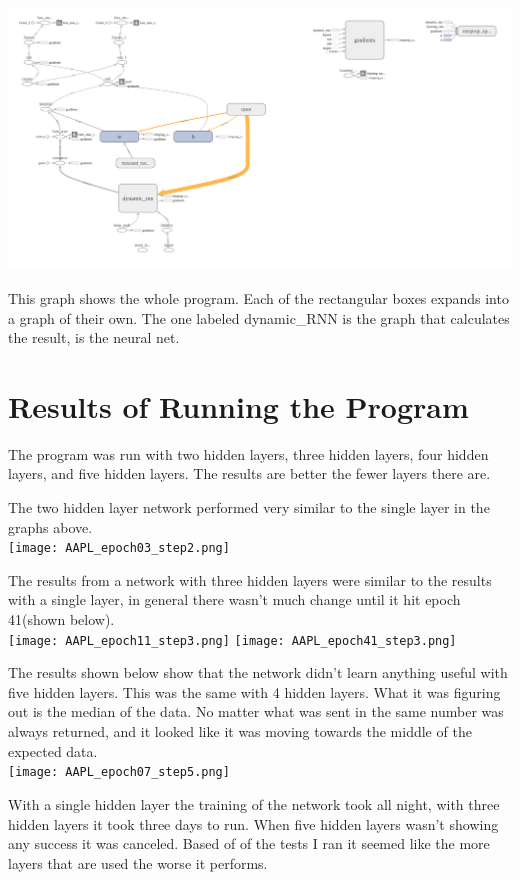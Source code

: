 \documentclass{article}
\begin{document}
\includegraphics[width=\textwidth]{png.png}

This graph shows the whole program. Each of the rectangular boxes expands into a graph of their own. The one labeled dynamic\_RNN is the graph that calculates the result, is the neural net.

\section{Results of Running the Program}
The program was run with two hidden layers, three hidden layers, four hidden layers, and five hidden layers. 
The results are better the fewer layers there are.


The two hidden layer network performed very similar to the single layer in the graphs above. \\

\texttt{[image: AAPL\_epoch03\_step2.png]}

The results from a network with three hidden layers were similar to the results with a single layer, in general there wasn't much change until it hit epoch 41(shown below). \\


\texttt{[image: AAPL\_epoch11\_step3.png]}
\texttt{[image: AAPL\_epoch41\_step3.png]}


The results shown below show that the network didn't learn anything useful with five hidden layers. 
This was the same with 4 hidden layers.
What it was figuring out is the median of the data.
No matter what was sent in the same number was always returned, and it looked like it was moving towards the middle of the expected data. \\


\texttt{[image: AAPL\_epoch07\_step5.png]}

With a single hidden layer the training of the network took all night, with three hidden layers it took three days to run. 
When five hidden layers wasn't showing any success it was canceled. 
Based of of the tests I ran it seemed like the more layers that are used the worse it performs.
\end{document}
